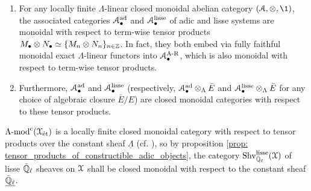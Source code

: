                 \begin{proposition} \label{prop: tensor_products_of_constructible_adic_objects}
                    \noindent
                    \begin{enumerate}
                        \item \cite[Proposition 6.1]{laszlo_olsson_adic_sheaves_on_artin_stacks_2} For any locally finite $\Lambda$-linear closed monoidal abelian category $(\calA, \tensor, \1)$, the associated categories $\mathcal{A}_{\bullet}^{\mathrm{ad}}$ and $\mathcal{A}_{\bullet}^{\mathrm{lisse}}$ of adic and lisse systems are monoidal with respect to term-wise tensor products $M_{\bullet} \tensor N_{\bullet} \cong \{M_n \tensor N_n\}_{n \in \Z}$. In fact, they both embed via fully faithful monoidal exact $\Lambda$-linear functors into $\mathcal{A}_{\bullet}^{\mathrm{A\text{-}R}}$, which is also monoidal with respect to term-wise tensor products. 
                        \item \cite[Theorem III.12.2 and Appendix A]{kiehl_weissauer_weil_conjecture_perverse_sheaves_and_l_adic_fourier_transform} Furthermore, $\mathcal{A}_{\bullet}^{\mathrm{ad}}$ and $\mathcal{A}_{\bullet}^{\mathrm{lisse}}$ (respectively, $\calA_{\bullet}^{\ad} \tensor_{\Lambda} \bar{E}$ and $\calA_{\bullet}^{\lisse} \tensor_{\Lambda} \bar{E}$ for any choice of algebraic closure $\bar{E}/E$) are closed monoidal categories with respect to these tensor products.
                    \end{enumerate}
                \end{proposition}
                \begin{example} \label{def: tensor_products_of_constructible_adic_sheaves}
                    $\Lambda\text{-}\mathrm{mod}^{\mathrm{c}}(\mathcal{X}_{\mathrm{\acute{e}t}})$ is a locally finite closed monoidal category with respect to tensor products over the constant sheaf $\underline{\Lambda}$ (cf. \cite[\href{https://stacks.math.columbia.edu/tag/093P}{Tag 093P}]{stacks}), so by proposition \ref{prop: tensor_products_of_constructible_adic_objects}, the category $\mathrm{Shv}_{\bar{\mathbb{Q}}_{\ell}}^{\mathrm{lisse}}(\mathcal{X})$ of lisse $\bar{\mathbb{Q}}_{\ell}$ sheaves on $\mathcal{X}$ shall be closed monoidal with respect to the constant sheaf $\underline{\bar{\mathbb{Q}}_{\ell}}$.
                \end{example}
                
